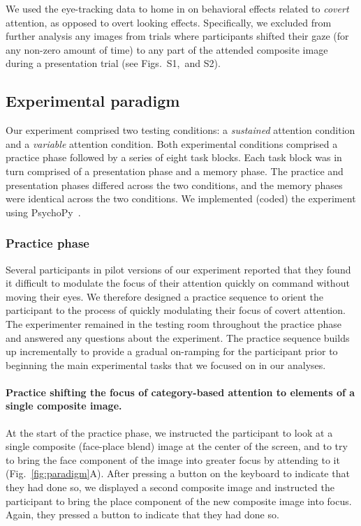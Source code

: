 \documentclass[english]{article}
\newcommand{\gazeLocations}{S1}
\newcommand{\excludedTrials}{S2}
\begin{document}
We used the eye-tracking data to home in on behavioral effects related to
\textit{covert} attention, as opposed to overt looking effects. Specifically,
we excluded from further analysis any images from trials where participants
shifted their gaze (for any non-zero amount of time) to any part of the
attended composite image during a presentation trial (see
Figs.~\gazeLocations,~and \excludedTrials).

\subsection*{Experimental paradigm}

Our experiment comprised two testing conditions: a \textit{sustained} attention
condition and a \textit{variable} attention condition. Both experimental
conditions comprised a practice phase followed by a series of eight task
blocks. Each task block was in turn comprised of a presentation phase and a
memory phase. The practice and presentation phases differed across the two
conditions, and the memory phases were identical across the two conditions.
We implemented (coded) the experiment using PsychoPy~\citep{PeirEtal19}.

\subsubsection*{Practice phase}

Several participants in pilot versions of our experiment reported that they
found it difficult to modulate the focus of their attention quickly on command
without moving their eyes. We therefore designed a practice sequence to orient
the participant to the process of quickly modulating their focus of covert
attention. The experimenter remained in the testing room throughout the
practice phase and answered any questions about the experiment. The practice
sequence builds up incrementally to provide a gradual on-ramping for the
participant prior to beginning the main experimental tasks that we focused on
in our analyses.

\paragraph{Practice shifting the focus of category-based attention to elements
of a single composite image.}

At the start of the practice phase, we instructed the participant to look at a
single composite (face-place blend) image at the center of the screen, and to
try to bring the face component of the image into greater focus by attending to
it (Fig.~\ref{fig:paradigm}A). After pressing a button on the keyboard to
indicate that they had done so, we displayed a second composite image and
instructed the participant to bring the place component of the new composite
image into focus. Again, they pressed a button to indicate that they had done
so.
\end{document}
